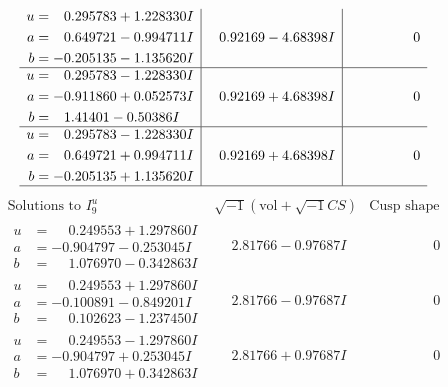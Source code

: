 \documentclass[1p]{elsarticle_modified}
\theoremstyle{definition}
\newcommand{\I}{\sqrt{-1}}
\begin{document}
$$\begin{array}{c|c|c}
\begin{aligned}
u &= \phantom{-}0.295783 + 1.228330 I \\
a &= \phantom{-}0.649721 - 0.994711 I \\
b &= -0.205135 - 1.135620 I\end{aligned}
 & \phantom{-}0.92169 - 4.68398 I & \phantom{-0.000000 } 0 \\ \hline\begin{aligned}
u &= \phantom{-}0.295783 - 1.228330 I \\
a &= -0.911860 + 0.052573 I \\
b &= \phantom{-}1.41401 - 0.50386 I\end{aligned}
 & \phantom{-}0.92169 + 4.68398 I & \phantom{-0.000000 } 0 \\ \hline\begin{aligned}
u &= \phantom{-}0.295783 - 1.228330 I \\
a &= \phantom{-}0.649721 + 0.994711 I \\
b &= -0.205135 + 1.135620 I\end{aligned}
 & \phantom{-}0.92169 + 4.68398 I & \phantom{-0.000000 } 0\\
 \hline 
 \end{array}$$\newpage$$\begin{array}{c|c|c}  
\text{Solutions to }I^u_{9}& \I (\text{vol} + \sqrt{-1}CS) & \text{Cusp shape}\\
 \hline 
\begin{aligned}
u &= \phantom{-}0.249553 + 1.297860 I \\
a &= -0.904797 - 0.253045 I \\
b &= \phantom{-}1.076970 - 0.342863 I\end{aligned}
 & \phantom{-}2.81766 - 0.97687 I & \phantom{-0.000000 } 0 \\ \hline\begin{aligned}
u &= \phantom{-}0.249553 + 1.297860 I \\
a &= -0.100891 - 0.849201 I \\
b &= \phantom{-}0.102623 - 1.237450 I\end{aligned}
 & \phantom{-}2.81766 - 0.97687 I & \phantom{-0.000000 } 0 \\ \hline\begin{aligned}
u &= \phantom{-}0.249553 - 1.297860 I \\
a &= -0.904797 + 0.253045 I \\
b &= \phantom{-}1.076970 + 0.342863 I\end{aligned}
 & \phantom{-}2.81766 + 0.97687 I & \phantom{-0.000000 } 0 \\ \hline\begin{aligned}

\end{aligned}
\end{array}$$
\end{document}
